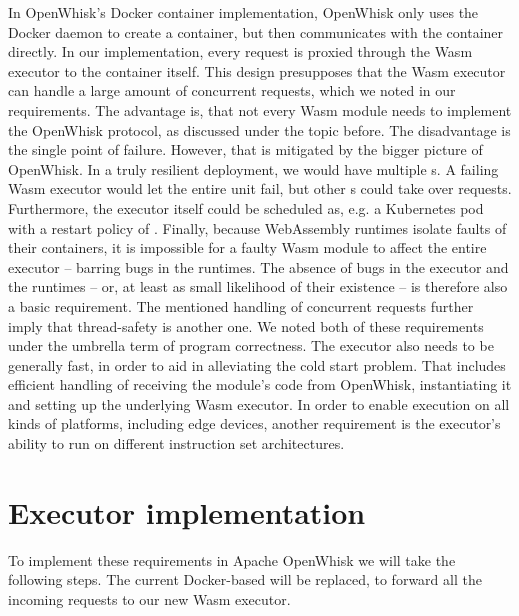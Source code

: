 In OpenWhisk's Docker container implementation, OpenWhisk only uses the Docker daemon to create a container, but then communicates with the container directly. In our implementation, every request is proxied through the Wasm executor to the container itself. This design presupposes that the Wasm executor can handle a large amount of concurrent requests, which we noted in our requirements. The advantage is, that not every Wasm module needs to implement the OpenWhisk protocol, as discussed under the  topic before. The disadvantage is the single point of failure. However, that is mitigated by the bigger picture of OpenWhisk. In a truly resilient deployment, we would have multiple s. A failing Wasm executor would let the entire  unit fail, but other s could take over requests. Furthermore, the executor itself could be scheduled as, e.g. a Kubernetes pod with a restart policy of . Finally, because WebAssembly runtimes isolate faults of their containers, it is impossible for a faulty Wasm module to affect the entire executor -- barring bugs in the runtimes. The absence of bugs in the executor and the runtimes -- or, at least as small likelihood of their existence -- is therefore also a basic requirement. The mentioned handling of concurrent requests further imply that thread-safety is another one. We noted both of these requirements under the umbrella term of program correctness.
The executor also needs to be generally fast, in order to aid in alleviating the cold start problem. That includes efficient handling of receiving the module's code from OpenWhisk, instantiating it and setting up the underlying Wasm executor. In order to enable execution on all kinds of platforms, including edge devices, another requirement is the executor's ability to run on different instruction set architectures.


\section{Executor implementation}


To implement these requirements in Apache OpenWhisk we will take the following steps. The current Docker-based  will be replaced, to forward all the incoming requests to our new Wasm executor.

